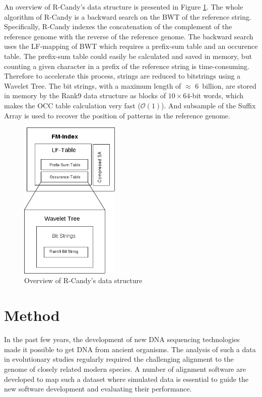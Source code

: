 \documentclass[11pt,a4paper]{report}
\begin{document}
An overview of R-Candy's data structure is presented 
in Figure \ref{DSOverview}\cite{Wavthesis}.
The whole algorithm of R-Candy is a backward search on the 
BWT of the reference string. Specifically, R-Candy indexes the concatenation of the 
complement of the reference genome with the reverse of the reference
genome.  The backward search uses the LF-mapping 
of BWT which requires a prefix-sum table and an occurence table.
The prefix-sum table could easily be calculated and saved in memory,
but counting a given character in a prefix of the reference string
is time-consuming. Therefore to accelerate this process, strings are
reduced to bitstrings using a  Wavelet Tree.
The bit strings, with a maximum length of $\approx$ 6~billion, are stored
in memory by the Rank9 data structure as blocks of $10 \times 64$-bit
words, which makes the OCC table calculation very fast ($\mathcal{O}(1)$).
And subsample of the Suffix Array is used to recover
the position of patterns in the reference genome.


\begin{figure}[H]
\centering
\includegraphics[width=4.75cm]{pictures/DSOverview2.png}
\caption{Overview of R-Candy's data structure }
\label{DSOverview}
\end{figure}





\section{Method} \label{Method}

In the past few years, the development of new DNA sequencing
technologies made it possible to get DNA from ancient organisms.  The
analysis of such a data in evolutionary studies regularly required the
challenging alignment to the genome of closely related modern species.
A number of alignment software are developed to map such a dataset where 
simulated data is essential to guide the new software development and 
evaluating their performance.
\end{document}
